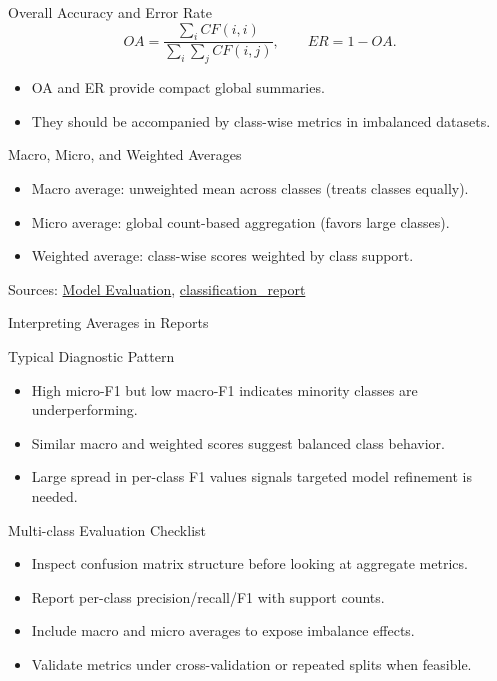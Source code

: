 \documentclass[10pt]{beamer}
\begin{document}
\begin{frame}{Overall Accuracy and Error Rate}
  \justifying
  \[
    OA = \frac{\sum_i CF(i,i)}{\sum_i\sum_j CF(i,j)},
    \qquad
    ER = 1 - OA.
  \]
  \begin{itemize}
    \item OA and ER provide compact global summaries.
    \item They should be accompanied by class-wise metrics in imbalanced datasets.
  \end{itemize}
\end{frame}

\begin{frame}{Macro, Micro, and Weighted Averages}
  \justifying
  \begin{itemize}
    \item Macro average: unweighted mean across classes (treats classes equally).
    \item Micro average: global count-based aggregation (favors large classes).
    \item Weighted average: class-wise scores weighted by class support.
  \end{itemize}
  \vspace{0.3em}
  {\footnotesize Sources: \href{https://scikit-learn.org/stable/modules/model_evaluation.html}{Model Evaluation}, \href{https://scikit-learn.org/stable/modules/generated/sklearn.metrics.classification_report.html}{classification\_report}}
\end{frame}

\begin{frame}{Interpreting Averages in Reports}
  \justifying
  \begin{examplebox}{Typical Diagnostic Pattern}
    \begin{itemize}
      \item High micro-F1 but low macro-F1 indicates minority classes are underperforming.
      \item Similar macro and weighted scores suggest balanced class behavior.
      \item Large spread in per-class F1 values signals targeted model refinement is needed.
    \end{itemize}
  \end{examplebox}
\end{frame}

\begin{frame}{Multi-class Evaluation Checklist}
  \justifying
  \begin{itemize}
    \item Inspect confusion matrix structure before looking at aggregate metrics.
    \item Report per-class precision/recall/F1 with support counts.
    \item Include macro and micro averages to expose imbalance effects.
    \item Validate metrics under cross-validation or repeated splits when feasible.
  \end{itemize}
\end{frame}
\end{document}
